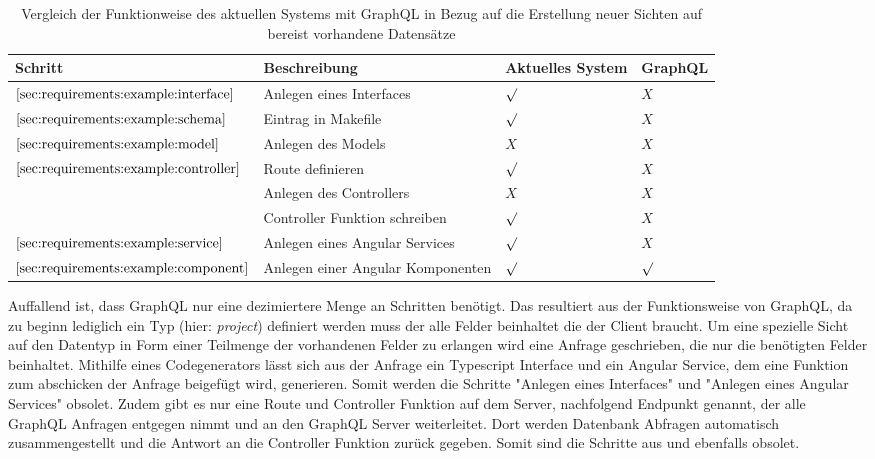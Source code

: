 \begin{table}[h]
    \begin{tabular}{|p{}|p{}|p{}|p{}|}
        \hline
        \textbf{Schritt} & \textbf{Beschreibung} & \textbf{Aktuelles \newline System} & \textbf{GraphQL} \\ \hline
        $\ref{sec:requirements:example:interface}$ & Anlegen eines Interfaces & $\surd$ &  $X$ \\ \hline
        $\ref{sec:requirements:example:schema}$ & Eintrag in Makefile & $\surd$ &  $X$ \\ \hline
        $\ref{sec:requirements:example:model}$ & Anlegen des Models & $X$ &  $X$ \\ \hline
        \multirow{3}{*}{$\ref{sec:requirements:example:controller}$}
        & Route definieren & $\surd$ &  $X$ \\
        & Anlegen des Controllers & $X$ &  $X$ \\
        & Controller Funktion schreiben & $\surd$ &  $X$ \\ \hline
        $\ref{sec:requirements:example:service}$ & Anlegen eines Angular Services & $\surd$ &  $X$ \\ \hline
        $\ref{sec:requirements:example:component}$ & Anlegen einer Angular Komponenten & $\surd$ &  $\surd$ \\ \hline
    \end{tabular}
    \vspace{5pt}
    \caption{Vergleich der Funktionweise des aktuellen Systems mit GraphQL in Bezug auf die Erstellung neuer Sichten auf bereist vorhandene Datensätze}
    \label{tbl:newview}
\end{table}

Auffallend ist, dass GraphQL nur eine dezimiertere Menge an Schritten benötigt. Das resultiert aus der Funktionsweise von GraphQL,
da zu beginn lediglich ein Typ (hier: \emph{project}) definiert werden muss der alle Felder beinhaltet die der Client braucht.
Um eine spezielle Sicht auf den Datentyp in Form einer Teilmenge der vorhandenen Felder zu erlangen wird eine Anfrage geschrieben, die
nur die benötigten Felder beinhaltet. Mithilfe eines Codegenerators lässt sich aus der Anfrage ein Typescript Interface und ein Angular Service,
dem eine Funktion zum abschicken der Anfrage beigefügt wird, generieren.
Somit werden die Schritte "Anlegen eines Interfaces" und "Anlegen eines Angular Services" obsolet.
Zudem gibt es nur eine Route und Controller Funktion auf dem Server, nachfolgend Endpunkt genannt, der alle GraphQL Anfragen entgegen nimmt
und an den GraphQL Server weiterleitet. Dort werden Datenbank Abfragen automatisch zusammengestellt und die Antwort an die Controller Funktion zurück gegeben.
Somit sind die Schritte aus  und  ebenfalls obsolet.

